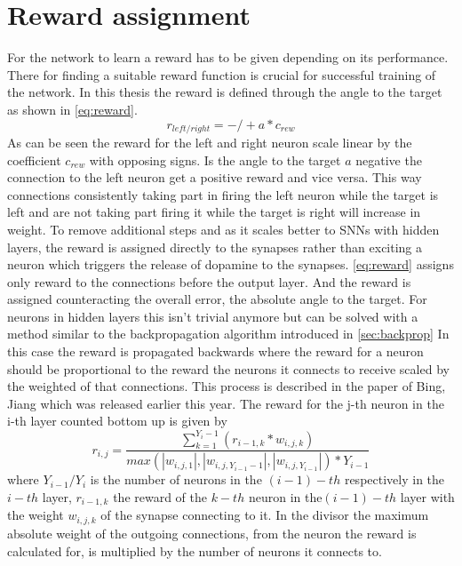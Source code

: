 \section{Reward assignment}\label{sec:rewardAss}
For the network to learn a reward has to be given depending on its performance. There for finding a suitable reward function is crucial for successful training of the network.
In this thesis the reward is defined through the angle to the target as shown in \autoref{eq:reward}.
\begin{equation}\label{eq:reward}
r_{left/right} = -/+ a * c_{rew}
\end{equation}
As can be seen the reward for the left and right neuron scale linear by the coefficient $c_{rew}$ with opposing signs. Is the angle to the target $a$ negative the connection to the left neuron get a positive reward and vice versa. This way connections consistently taking part in firing the left neuron while the target is left and are not taking part firing it while the target is right will increase in weight.
To remove additional steps and as it scales better to SNNs with hidden layers, the reward is assigned directly to the synapses rather than exciting a neuron which triggers the release of dopamine to the synapses.
\autoref{eq:reward} assigns only reward to the connections before the output layer. And the reward is assigned counteracting the overall error, the absolute angle to the target. For neurons in hidden layers this isn’t trivial anymore but can be solved with a method similar to the backpropagation algorithm introduced in \autoref{sec:backprop}
In this case the reward is propagated backwards where the reward for a neuron should be proportional to the reward the neurons it connects to receive scaled by the weighted of that connections. This process is described in the paper of Bing, Jiang \cite{bing2019end} which was released earlier this year. The reward for the j-th neuron in the i-th layer counted bottom up is given by
\begin{equation}\label{eq:rewardProp}
r_{i,j} = 
\frac{ \sum_{k=1}^{Y_i-1}( r_{i-1,k} * w_{i,j,k}) }
	{ max( |w_{i,j,1}|, |w_{i,j,Y_{i-1}-1}|, |w_{i,j,Y_{i-1}}| ) * Y_{i-1}  } 
\end{equation}
where $Y_{i-1}/Y_{i}$ is the number of neurons in the $(i-1)-th$ respectively in the $i-th$ layer, $r_{i-1,k}$ the reward of the $k-th$ neuron in the$(i-1)-th$ layer with the weight $w_{i,j,k}$ of the synapse connecting to it. In the divisor the maximum absolute weight of the outgoing connections, from the neuron the reward is calculated for, is multiplied by the number of neurons it connects to.


